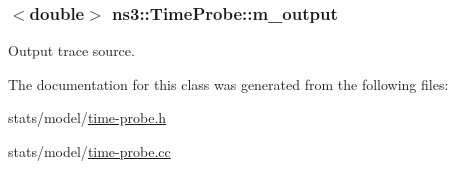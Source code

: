 \subsubsection[{\texorpdfstring{m\+\_\+output}{m_output}}]{$<$double$>$ ns3\+::\+Time\+Probe\+::m\+\_\+output\hspace{0.3cm}{\ttfamily [private]}}\hypertarget{classns3_1_1TimeProbe_abbc3ed620512e2f8ca1c180727206e4e}{}\label{classns3_1_1TimeProbe_abbc3ed620512e2f8ca1c180727206e4e}


Output trace source. 



The documentation for this class was generated from the following files\+:\begin{DoxyCompactItemize}
\item 
stats/model/\hyperlink{time-probe_8h}{time-\/probe.\+h}\item 
stats/model/\hyperlink{time-probe_8cc}{time-\/probe.\+cc}\end{DoxyCompactItemize}
